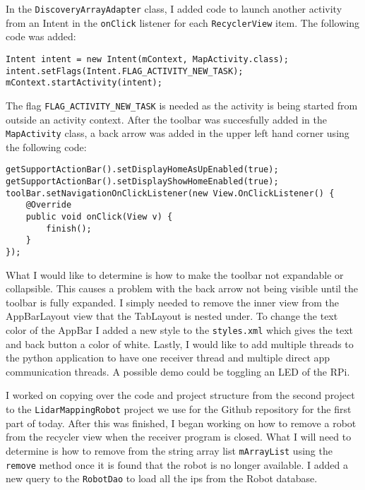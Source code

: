 \documentclass[fontsize=11pt, %
                             paper=a4, %
                             twoside, %
                             captions=tableheading,
                             index=totoc,
                             hyperref]{labbook}
\begin{document}
\begin{addmargin}[0cm]{0cm}
In the \texttt{DiscoveryArrayAdapter} class, I added code to launch another activity from an Intent in the \texttt{onClick} listener for each \texttt{RecyclerView} item. The following code was added:
\begin{Verbatim}
Intent intent = new Intent(mContext, MapActivity.class);
intent.setFlags(Intent.FLAG_ACTIVITY_NEW_TASK);
mContext.startActivity(intent);
\end{Verbatim}
The flag \texttt{FLAG\_ACTIVITY\_NEW\_TASK} is needed as the activity is being started from outside an activity context. After the toolbar was succesfully added in the \texttt{MapActivity} class, a back arrow was added in the upper left hand corner using the following code:
\begin{Verbatim}
getSupportActionBar().setDisplayHomeAsUpEnabled(true);
getSupportActionBar().setDisplayShowHomeEnabled(true);
toolBar.setNavigationOnClickListener(new View.OnClickListener() {
	@Override
	public void onClick(View v) {
		finish();
	}
});
\end{Verbatim}
What I would like to determine is how to make the toolbar not expandable or collapsible. This causes a problem with the back arrow not being visible until the toolbar is fully expanded. I simply needed to remove the inner view from the AppBarLayout view that the TabLayout is nested under.
\medbreak\noindent
To change the text color of the AppBar I added a new style to the \texttt{styles.xml} which gives the text and back button a color of white. Lastly, I would like to add multiple threads to the python application to have one receiver thread and multiple direct app communication threads. A possible demo could be toggling an LED of the RPi.

I worked on copying over the code and project structure from the second project to the \texttt{LidarMappingRobot} project we use for the Github repository for the first part of today. After this was finished, I began working on how to remove a robot from the recycler view when the receiver program is closed. What I will need to determine is how to remove from the string array list \texttt{mArrayList} using the \texttt{remove} method once it is found that the robot is no longer available. I added a new query to the \texttt{RobotDao} to load all the ips from the Robot database. 


\end{addmargin}
\end{document}
